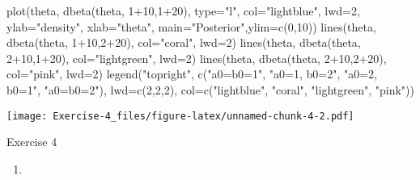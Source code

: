 \documentclass[
]{article}
\newenvironment{Shaded}{\begin{snugshade}}{\end{snugshade}}
\newcommand{\AttributeTok}[1]{\textcolor[rgb]{0.77,0.63,0.00}{#1}}
\newcommand{\DecValTok}[1]{\textcolor[rgb]{0.00,0.00,0.81}{#1}}
\newcommand{\FunctionTok}[1]{\textcolor[rgb]{0.00,0.00,0.00}{#1}}
\newcommand{\NormalTok}[1]{#1}
\newcommand{\SpecialCharTok}[1]{\textcolor[rgb]{0.00,0.00,0.00}{#1}}
\newcommand{\StringTok}[1]{\textcolor[rgb]{0.31,0.60,0.02}{#1}}
\providecommand{\tightlist}{%
  \setlength{\itemsep}{0pt}\setlength{\parskip}{0pt}}
\begin{document}
\begin{Shaded}
\begin{Highlighting}[]
\FunctionTok{plot}\NormalTok{(theta, }\FunctionTok{dbeta}\NormalTok{(theta, }\DecValTok{1}\SpecialCharTok{+}\DecValTok{10}\NormalTok{,}\DecValTok{1}\SpecialCharTok{+}\DecValTok{20}\NormalTok{), }\AttributeTok{type=}\StringTok{"l"}\NormalTok{, }\AttributeTok{col=}\StringTok{"lightblue"}\NormalTok{, }\AttributeTok{lwd=}\DecValTok{2}\NormalTok{,}
\AttributeTok{ylab=}\StringTok{"density"}\NormalTok{, }\AttributeTok{xlab=}\StringTok{"theta"}\NormalTok{, }\AttributeTok{main=}\StringTok{"Posterior"}\NormalTok{,}\AttributeTok{ylim=}\FunctionTok{c}\NormalTok{(}\DecValTok{0}\NormalTok{,}\DecValTok{10}\NormalTok{))}
\FunctionTok{lines}\NormalTok{(theta, }\FunctionTok{dbeta}\NormalTok{(theta, }\DecValTok{1}\SpecialCharTok{+}\DecValTok{10}\NormalTok{,}\DecValTok{2}\SpecialCharTok{+}\DecValTok{20}\NormalTok{), }\AttributeTok{col=}\StringTok{"coral"}\NormalTok{, }\AttributeTok{lwd=}\DecValTok{2}\NormalTok{)}
\FunctionTok{lines}\NormalTok{(theta, }\FunctionTok{dbeta}\NormalTok{(theta, }\DecValTok{2}\SpecialCharTok{+}\DecValTok{10}\NormalTok{,}\DecValTok{1}\SpecialCharTok{+}\DecValTok{20}\NormalTok{), }\AttributeTok{col=}\StringTok{"lightgreen"}\NormalTok{, }\AttributeTok{lwd=}\DecValTok{2}\NormalTok{)}
\FunctionTok{lines}\NormalTok{(theta, }\FunctionTok{dbeta}\NormalTok{(theta, }\DecValTok{2}\SpecialCharTok{+}\DecValTok{10}\NormalTok{,}\DecValTok{2}\SpecialCharTok{+}\DecValTok{20}\NormalTok{), }\AttributeTok{col=}\StringTok{"pink"}\NormalTok{, }\AttributeTok{lwd=}\DecValTok{2}\NormalTok{)}
\FunctionTok{legend}\NormalTok{(}\StringTok{"topright"}\NormalTok{, }\FunctionTok{c}\NormalTok{(}\StringTok{"a0=b0=1"}\NormalTok{, }\StringTok{"a0=1, b0=2"}\NormalTok{, }\StringTok{"a0=2, b0=1"}\NormalTok{, }\StringTok{"a0=b0=2"}\NormalTok{),}
\AttributeTok{lwd=}\FunctionTok{c}\NormalTok{(}\DecValTok{2}\NormalTok{,}\DecValTok{2}\NormalTok{,}\DecValTok{2}\NormalTok{), }\AttributeTok{col=}\FunctionTok{c}\NormalTok{(}\StringTok{"lightblue"}\NormalTok{, }\StringTok{"coral"}\NormalTok{, }\StringTok{"lightgreen"}\NormalTok{, }\StringTok{"pink"}\NormalTok{))}
\end{Highlighting}
\end{Shaded}

\texttt{[image: Exercise-4\_files/figure-latex/unnamed-chunk-4-2.pdf]}

Exercise 4

\begin{enumerate}
\def\labelenumi{\arabic{enumi}.}
\tightlist
\item
\end{enumerate}
\end{document}
